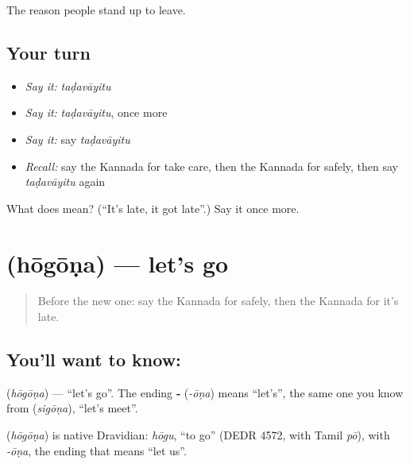 \begin{grammarlens}[title={What you've built}]
The reason people stand up to leave.
\end{grammarlens}

\subsection*{Your turn}
\begin{itemize}
\raggedright
  \item \emph{Say it:} \emph{taḍavāyitu}
  \item \emph{Say it:} \emph{taḍavāyitu}, once more
  \item \emph{Say it:} say \emph{taḍavāyitu}
  \item \emph{Recall:} say the Kannada for take care, then the Kannada for safely, then say \emph{taḍavāyitu} again
\end{itemize}

\begin{tcolorbox}[breakable,colback=teal!4,colframe=teal!35!black,title={Before you move on}]
What does  mean? (\textquotedblleft{}It's late, it got late\textquotedblright{}.) Say it once more.
\end{tcolorbox}
\section[\texorpdfstring{\kn{ಹೋಗೋಣ} (hōgōṇa)}{ಹೋಗೋಣ (hōgōṇa)}]{ (hōgōṇa) — let's go}

\label{lesson:KA-C89-letsgo}



\begin{quote}
Before the new one: say the Kannada for safely, then the Kannada for it's late.
\end{quote}

\subsection*{You'll want to know: }
\textbf{} (\emph{hōgōṇa}) — \textquotedblleft{}let's go\textquotedblright{}. The ending \textbf{‑} (\emph{-ōṇa}) means \textquotedblleft{}let's\textquotedblright{}, the same one you know from \textbf{} (\emph{sigōṇa}), \textquotedblleft{}let's meet\textquotedblright{}.

\begin{cousinweb}
\textbf{} (\emph{hōgōṇa}) is native Dravidian: \emph{hōgu}, \textquotedblleft{}to go\textquotedblright{} (DEDR 4572, with Tamil \emph{pō}), with \emph{-ōṇa}, the ending that means \textquotedblleft{}let us\textquotedblright{}.
\end{cousinweb}

